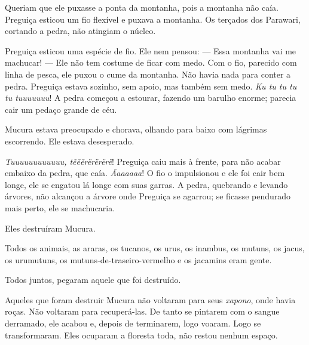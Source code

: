Queriam que ele puxasse a ponta da montanha, pois a montanha não caía.
 Preguiça esticou um fio flexível e puxava a montanha. Os terçados dos
 Parawari, cortando a pedra, não atingiam o núcleo. 

Preguiça esticou uma espécie de fio. Ele nem pensou: --- Essa montanha vai
me machucar! --- Ele não tem costume de ficar com medo. Com o fio,
parecido com linha de pesca, ele puxou o cume da montanha. Não havia
nada para conter a pedra. Preguiça estava sozinho, sem apoio, mas também
sem medo. \textit{Ku tu tu tu tu tuuuuuuu}! A pedra começou a estourar,
fazendo um barulho enorme; parecia cair um pedaço grande de céu. 

Mucura estava preocupado e chorava, olhando para baixo com lágrimas
escorrendo. Ele estava desesperado. 

\textit{Tuuuuuuuuuuuu, tẽẽẽrërërërë}! Preguiça caiu mais à frente, para
não acabar embaixo da pedra, que caía. \textit{Ãaaaaaa}! O fio o
impulsionou e ele foi cair bem longe, ele se engatou lá longe com suas
garras. A pedra, quebrando e levando árvores, não alcançou a árvore onde
Preguiça se agarrou; se ficasse pendurado mais perto, ele se
machucaria. 

Eles destruíram Mucura. 

Todos os animais, as araras, os tucanos, os urus, os inambus, os mutuns,
os jacus, os urumutuns, os mutuns-de-traseiro-vermelho e os jacamins
eram gente. 

Todos juntos, pegaram aquele que foi destruído. 


Aqueles que foram destruir Mucura não voltaram para seus \textit{xapono}, onde
havia roças. Não voltaram para recuperá-las. De tanto se pintarem com o
sangue derramado, ele acabou e, depois de terminarem, logo voaram. Logo
se transformaram. Eles ocuparam a floresta toda, não restou nenhum
espaço. 


